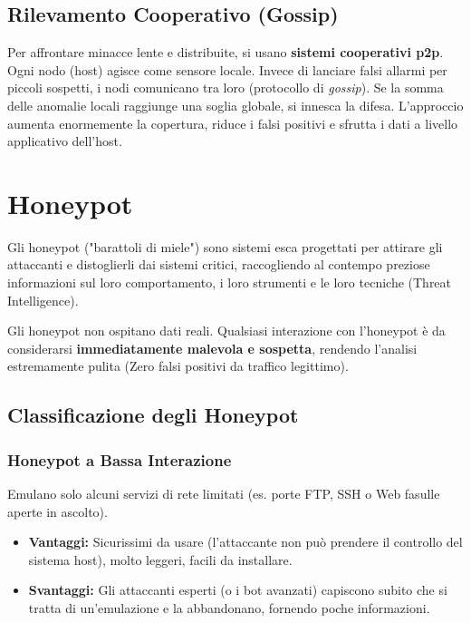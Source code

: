 \subsection{Rilevamento Cooperativo (Gossip)}
Per affrontare minacce lente e distribuite, si usano \textbf{sistemi cooperativi p2p}. Ogni nodo (host) agisce come sensore locale. Invece di lanciare falsi allarmi per piccoli sospetti, i nodi comunicano tra loro (protocollo di \textit{gossip}). Se la somma delle anomalie locali raggiunge una soglia globale, si innesca la difesa.
L'approccio aumenta enormemente la copertura, riduce i falsi positivi e sfrutta i dati a livello applicativo dell'host.

\section{Honeypot}

\begin{defbox}[Honeypot]
Gli honeypot ("barattoli di miele") sono sistemi esca progettati per attirare gli attaccanti e distoglierli dai sistemi critici, raccogliendo al contempo preziose informazioni sul loro comportamento, i loro strumenti e le loro tecniche (Threat Intelligence).
\end{defbox}

Gli honeypot non ospitano dati reali. Qualsiasi interazione con l'honeypot è da considerarsi \textbf{immediatamente malevola e sospetta}, rendendo l'analisi estremamente pulita (Zero falsi positivi da traffico legittimo).

\subsection{Classificazione degli Honeypot}

\subsubsection{Honeypot a Bassa Interazione}
Emulano solo alcuni servizi di rete limitati (es. porte FTP, SSH o Web fasulle aperte in ascolto).
\begin{itemize}
    \item \textbf{Vantaggi:} Sicurissimi da usare (l'attaccante non può prendere il controllo del sistema host), molto leggeri, facili da installare.
    \item \textbf{Svantaggi:} Gli attaccanti esperti (o i bot avanzati) capiscono subito che si tratta di un'emulazione e la abbandonano, fornendo poche informazioni.
\end{itemize}

